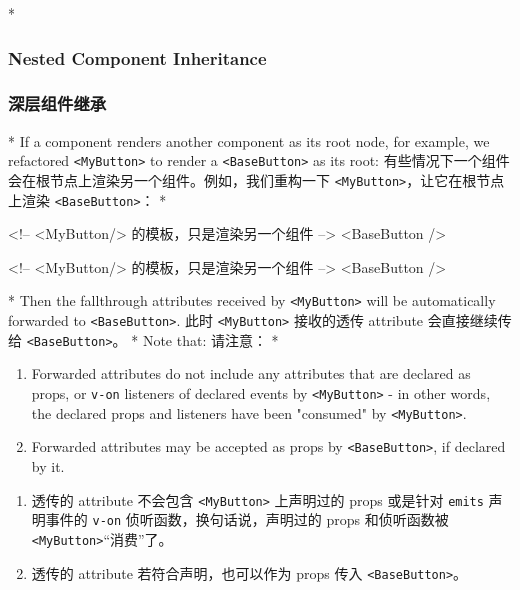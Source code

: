 \begin{paracol}{2}
\switchcolumn[0]*%
\subsubsection{Nested Component Inheritance}
\switchcolumn
\subsubsection{深层组件继承}
\switchcolumn[0]*%
If a component renders another component as its root node, for example,
we refactored \texttt{\textless{}MyButton\textgreater{}} to render a
\texttt{\textless{}BaseButton\textgreater{}} as its root:
\switchcolumn
有些情况下一个组件会在根节点上渲染另一个组件。例如，我们重构一下
\texttt{\textless{}MyButton\textgreater{}}，让它在根节点上渲染
\texttt{\textless{}BaseButton\textgreater{}}：
\switchcolumn[0]*%
\begin{codeHtml}
<!-- <MyButton/> 的模板，只是渲染另一个组件 -->
<BaseButton />
\end{codeHtml}
\switchcolumn
\begin{codeHtml}
<!-- <MyButton/> 的模板，只是渲染另一个组件 -->
<BaseButton />
\end{codeHtml}
\switchcolumn[0]*%
Then the fallthrough attributes received by
\texttt{\textless{}MyButton\textgreater{}} will be automatically
forwarded to \texttt{\textless{}BaseButton\textgreater{}}.
\switchcolumn
此时 \texttt{\textless{}MyButton\textgreater{}} 接收的透传 attribute
会直接继续传给 \texttt{\textless{}BaseButton\textgreater{}}。
\switchcolumn[0]*%
Note that:
\switchcolumn
请注意：
\switchcolumn[0]*%
\begin{enumerate}
\def\labelenumi{\arabic{enumi}.}
\item
  Forwarded attributes do not include any attributes that are declared
  as props, or \texttt{v-on} listeners of declared events by
  \texttt{\textless{}MyButton\textgreater{}} - in other words, the
  declared props and listeners have been "consumed" by
  \texttt{\textless{}MyButton\textgreater{}}.
\item
  Forwarded attributes may be accepted as props by
  \texttt{\textless{}BaseButton\textgreater{}}, if declared by it.
\end{enumerate}
\switchcolumn
\begin{enumerate}
\def\labelenumi{\arabic{enumi}.}
\item
  透传的 attribute 不会包含 \texttt{\textless{}MyButton\textgreater{}}
  上声明过的 props 或是针对 \texttt{emits} 声明事件的 \texttt{v-on}
  侦听函数，换句话说，声明过的 props 和侦听函数被
  \texttt{\textless{}MyButton\textgreater{}}``消费''了。
\item
  透传的 attribute 若符合声明，也可以作为 props 传入
  \texttt{\textless{}BaseButton\textgreater{}}。
\end{enumerate}
\end{paracol}

